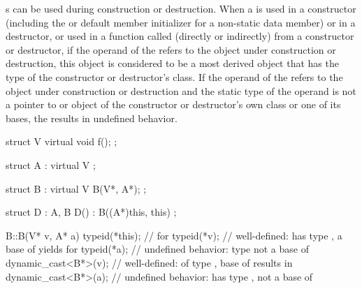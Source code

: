 \pnum
{}%
%
%
%
s can be used during construction
or destruction. When a
is used in a constructor (including the
 or default member initializer
for a non-static data member)
or in a destructor, or used in a function called (directly or indirectly) from
a constructor or destructor, if the operand of the
refers to the object under construction or destruction, this object is
considered to be a most derived object that has the type of the constructor or
destructor's class.
If the operand of the
refers to the object under construction or destruction and the static type of
the operand is not a pointer to or object of the constructor or destructor's
own class or one of its bases, the
results in undefined behavior.
%
%
%
%
%
\begin{example}
\begin{codeblock}
struct V {
  virtual void f();
};

struct A : virtual V { };

struct B : virtual V {
  B(V*, A*);
};

struct D : A, B {
  D() : B((A*)this, this) { }
};

B::B(V* v, A* a) {
  typeid(*this);                //  for 
  typeid(*v);                   // well-defined:  has type , a base of  yields  for 
  typeid(*a);                   // undefined behavior: type  not a base of 
  dynamic_cast<B*>(v);          // well-defined:  of type ,  base of  results in 
  dynamic_cast<B*>(a);          // undefined behavior:  has type ,  not a base of 
}
\end{codeblock}
\end{example}
%
%


